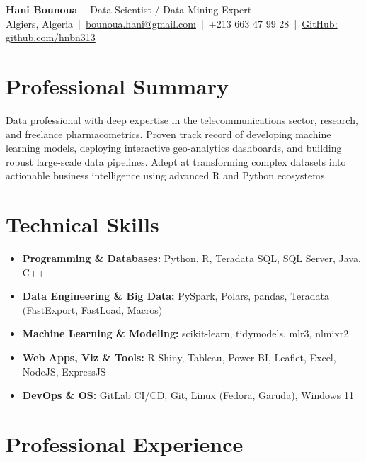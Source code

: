 \documentclass[11pt,letterpaper]{article}
\begin{document}
\begin{center}
    {\huge \textbf{Hani Bounoua} \,|\, \Large Data Scientist / Data Mining Expert} \\ \vspace{4pt}
    Algiers, Algeria \,|\, 
    \href{mailto:bounoua.hani@gmail.com}{bounoua.hani@gmail.com} \,|\, 
    +213 663 47 99 28 \,|\, 
    \href{https://www.github.com/hnbn313}{GitHub: github.com/hnbn313} \\
\end{center}

\vspace{0pt}

\section*{Professional Summary}
Data professional with deep expertise in the telecommunications sector, research, and freelance pharmacometrics. Proven track record of developing machine learning models, deploying interactive geo-analytics dashboards, and building robust large-scale data pipelines. Adept at transforming complex datasets into actionable business intelligence using advanced R and Python ecosystems.

\section*{Technical Skills}
\begin{itemize}[leftmargin=0.15in, label={}, itemsep=-2pt, topsep=2pt]
    \item \textbf{Programming \& Databases:} Python, R, Teradata SQL, SQL Server, Java, C++
    \item \textbf{Data Engineering \& Big Data:} PySpark, Polars, pandas, Teradata (FastExport, FastLoad, Macros)
    \item \textbf{Machine Learning \& Modeling:} scikit-learn, tidymodels, mlr3, nlmixr2
    \item \textbf{Web Apps, Viz \& Tools:} R Shiny, Tableau, Power BI, Leaflet, Excel, NodeJS, ExpressJS
    \item \textbf{DevOps \& OS:} GitLab CI/CD, Git, Linux (Fedora, Garuda), Windows 11
\end{itemize}

\section*{Professional Experience}
\end{document}
